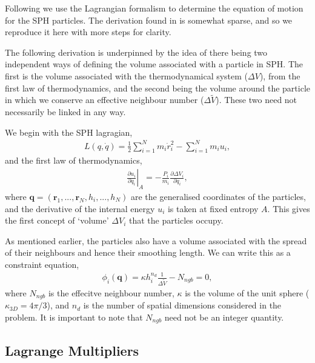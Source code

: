 Following \citet{hopkins2013} we use the Lagrangian formalism to determine the
equation of motion for the SPH particles. The derivation found in
\citet{hopkins2013} is somewhat sparse, and so we reproduce it here with more
steps for clarity.

The following derivation is underpinned by the idea of there being two
independent ways of defining the volume associated with a particle in SPH. The
first is the volume associated with the thermodynamical system ($\Delta V$),
from the first law of thermodynamics, and the second being the volume around the
particle in which we conserve an effective neighbour number ($\Delta \tilde{V}$).
These two need not necessarily be linked in any way.

We begin with the SPH lagragian,
\begin{align}
  L(q, \dot{q}) = \frac{1}{2}\sum^N_{i=1} m_i \dot{r}^2_i
    - \sum^N_{i=1} m_i u_i,
  \label{eqn:sph:derivation:sphlagrangian}
\end{align}
and the first law of thermodynamics,
\begin{align}
  \left. \frac{\partial u_i}{\partial q_i} \right|_A =
  -\frac{P_i}{m_i} \frac{\partial \Delta V_i}{\partial q_i},
  \label{eqn:sph:derivation:firstlaw}
\end{align}
where $\mathbf{q} = (\mathbf{r}_1, ..., \mathbf{r}_N, h_i, ..., h_N)$ are the
generalised coordinates of the particles, and the derivative of the internal
energy $u_i$ is taken at fixed entropy $A$. This gives the first concept of
`volume' $\Delta V_i$ that the particles occupy.

As mentioned earlier, the particles also have a volume associated with the
spread of their neighbours and hence their smoothing length. We can write this as
a constraint equation,
\begin{align}
    \phi_i(\mathbf{q}) = \kappa h_i^{n_d}
      \frac{1}{\Delta \tilde{V}} - N_{ngb} = 0,
  \label{eqn:sph:derivation:constraint}
\end{align}
where $N_{ngb}$ is the effecitve neighbour number, $\kappa$ is the volume of
the unit sphere ($\kappa_{3D} = 4\pi/3$), and $n_d$ is the number of spatial
dimensions considered in the problem. It is important to note that $N_{ngb}$
need not be an integer quantity.

\subsection{Lagrange Multipliers}

